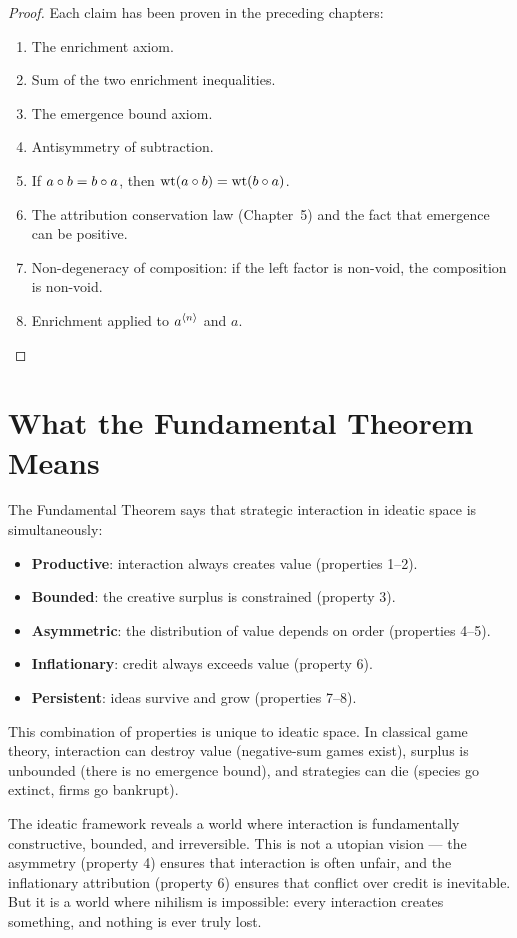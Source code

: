 \begin{proof}
Each claim has been proven in the preceding chapters:
\begin{enumerate}
\item The enrichment axiom.
\item Sum of the two enrichment inequalities.
\item The emergence bound axiom.
\item Antisymmetry of subtraction.
\item If $a \circ b = b \circ a$, then $\operatorname{wt}(a \circ b) = \operatorname{wt}(b \circ a)$.
\item The attribution conservation law (Chapter~5) and the fact that emergence can be positive.
\item Non-degeneracy of composition: if the left factor is non-void, the composition is non-void.
\item Enrichment applied to $a^{\langle n \rangle}$ and $a$.
\end{enumerate}
\end{proof}

\section{What the Fundamental Theorem Means}

The Fundamental Theorem says that strategic interaction in ideatic space is simultaneously:
\begin{itemize}
\item \textbf{Productive}: interaction always creates value (properties 1--2).
\item \textbf{Bounded}: the creative surplus is constrained (property 3).
\item \textbf{Asymmetric}: the distribution of value depends on order (properties 4--5).
\item \textbf{Inflationary}: credit always exceeds value (property 6).
\item \textbf{Persistent}: ideas survive and grow (properties 7--8).
\end{itemize}

This combination of properties is unique to ideatic space. In classical game theory, interaction can destroy value (negative-sum games exist), surplus is unbounded (there is no emergence bound), and strategies can die (species go extinct, firms go bankrupt).

The ideatic framework reveals a world where interaction is fundamentally constructive, bounded, and irreversible. This is not a utopian vision --- the asymmetry (property 4) ensures that interaction is often unfair, and the inflationary attribution (property 6) ensures that conflict over credit is inevitable. But it is a world where nihilism is impossible: every interaction creates something, and nothing is ever truly lost.

